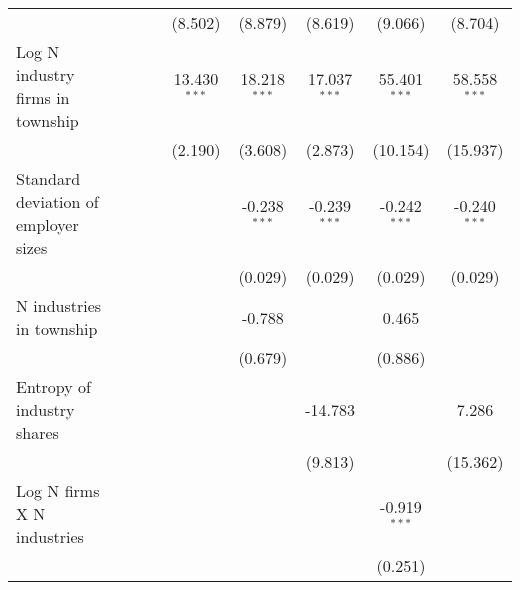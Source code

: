 \begin{tabular}{lcccccccc}
                                                         &                  &                 &                  & (8.502)          & (8.879)          & (8.619)          & (9.066)          & (8.704)\\   
   Log N industry firms in township                      &                  &                 &                  & 13.430$^{***}$   & 18.218$^{***}$   & 17.037$^{***}$   & 55.401$^{***}$   & 58.558$^{***}$\\   
                                                         &                  &                 &                  & (2.190)          & (3.608)          & (2.873)          & (10.154)         & (15.937)\\   
   Standard deviation of employer sizes                  &                  &                 &                  &                  & -0.238$^{***}$   & -0.239$^{***}$   & -0.242$^{***}$   & -0.240$^{***}$\\   
                                                         &                  &                 &                  &                  & (0.029)          & (0.029)          & (0.029)          & (0.029)\\   
   N industries in township                              &                  &                 &                  &                  & -0.788           &                  & 0.465            &   \\   
                                                         &                  &                 &                  &                  & (0.679)          &                  & (0.886)          &   \\   
   Entropy of industry shares                            &                  &                 &                  &                  &                  & -14.783          &                  & 7.286\\   
                                                         &                  &                 &                  &                  &                  & (9.813)          &                  & (15.362)\\   
   Log N firms X N industries                            &                  &                 &                  &                  &                  &                  & -0.919$^{***}$   &   \\   
                                                         &                  &                 &                  &                  &                  &                  & (0.251)          &   \\   

\end{tabular}
